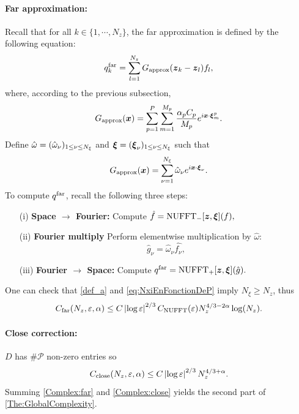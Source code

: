 \documentclass[smallextended]{svjour3}
\begin{document}
\paragraph{Far approximation:} Recall that for all $k \in \{1,\cdots,N_z\}$, the far approximation is defined by the following equation:
\[ q^{\text{far}}_k = \sum_{l=1}^{N_z} G_{\textup{approx}}(\boldsymbol{z}_k - \boldsymbol{z}_l) f_l,\]
where, according to the previous subsection,
\[G_{\textup{approx}}(\boldsymbol{x}) = \sum_{p=1}^P\sum_{m = 1}^{M_p} \dfrac{\alpha_pC_p}{M_p}e^{i \boldsymbol{x}\cdot \boldsymbol{\xi}^p_m}.\]
Define $\hat{\omega} = (\hat{\omega}_{\nu})_{1 \leq \nu \leq N_\xi}$ and $\boldsymbol{\xi} = (\boldsymbol{\xi}_{\nu})_{1 \leq \nu \leq N_\xi}$ such that
\[ G_{\textup{approx}}(\boldsymbol{x}) = \sum_{\nu=1}^{N_\xi} \hat{\omega}_\nu e^{i \boldsymbol{x} \cdot \boldsymbol{\xi}_\nu}.\]
To compute $q^{\textup{far}}$, recall the following three steps:
\begin{itemize}
	\item[(i)] \textbf{Space $\rightarrow$ Fourier: } Compute $\hat{f} = \textup{NUFFT}_-[\boldsymbol{z},\boldsymbol{\xi}](f),$
	\item[(ii)] \textbf{Fourier multiply} Perform elementwise multiplication by $\hat{\omega}$: 
	\[\hat{g}_{\nu} = \hat{\omega}_\nu \hat{f_\nu},\]
	\item[(iii)] \textbf{Fourier $\rightarrow$ Space: } Compute $q^{\text{far}} =  \textup{NUFFT}_+[\boldsymbol{z},\boldsymbol{\xi}](\hat{g}).$
\end{itemize}
One can check that \eqref{def_a} and \eqref{eq:NxiEnFonctionDeP} imply $N_{\xi} \geq N_z$, thus
\begin{equation}
	\label{Complex:far}
	C_{\textup{far}}(N_z,\varepsilon,\alpha) \leq C 	\left\lvert \log \varepsilon \right\rvert^{2/3} C_{\textup{NUFFT}}(\varepsilon) N_z^{4/3 - 2\alpha } \log(N_z).
\end{equation}
\paragraph{Close correction:} $D$ has $\# \mathcal{P}$ non-zero entries so 
\begin{equation}
	\label{Complex:close}
	C_{\textup{close}}(N_z,\varepsilon,\alpha) \leq C \left\lvert \log\varepsilon \right\rvert^{2/3}N_z^{4/3 + \alpha}.
\end{equation}
Summing \eqref{Complex:far} and \eqref{Complex:close} yields the second part of \autoref{The:GlobalComplexity}. 
																																																		
\end{document}
